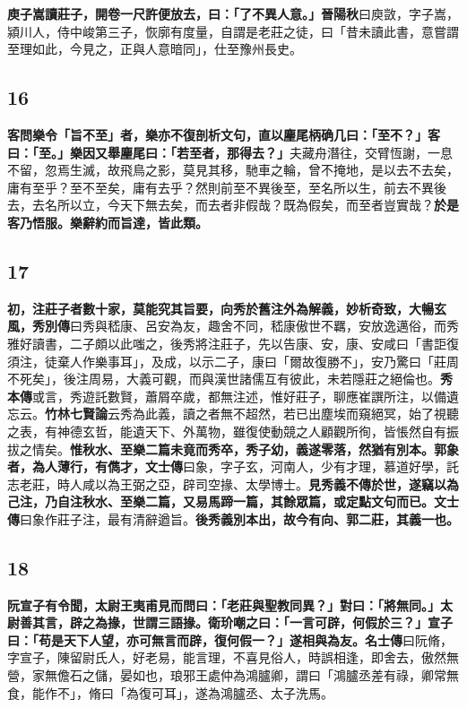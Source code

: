 \textbf{庾子嵩讀莊子，開卷一尺許便放去，曰：「了不異人意。」}{\footnotesize \textbf{晉陽秋}曰庾敳，字子嵩，潁川人，侍中峻第三子，恢廓有度量，自謂是老莊之徒，曰「昔未讀此書，意嘗謂至理如此，今見之，正與人意暗同」，仕至豫州長史。}

\subsection*{16}

\textbf{客問樂令「旨不至」者，樂亦不復剖析文句，直以麈尾柄确几曰：「至不？」客曰：「至。」樂因又舉麈尾曰：「若至者，那得去？」}{\footnotesize 夫藏舟潛往，交臂恆謝，一息不留，忽焉生滅，故飛鳥之影，莫見其移，馳車之輪，曾不掩地，是以去不去矣，庸有至乎？至不至矣，庸有去乎？然則前至不異後至，至名所以生，前去不異後去，去名所以立，今天下無去矣，而去者非假哉？既為假矣，而至者豈實哉？}\textbf{於是客乃悟服。樂辭約而旨達，皆此類。}

\subsection*{17}

\textbf{初，注莊子者數十家，莫能究其旨要，向秀於舊注外為解義，妙析奇致，大暢玄風，}{\footnotesize \textbf{秀別傳}曰秀與嵇康、呂安為友，趣舍不同，嵇康傲世不羈，安放逸邁俗，而秀雅好讀書，二子頗以此嗤之，後秀將注莊子，先以告康、安，康、安咸曰「書詎復須注，徒棄人作樂事耳」，及成，以示二子，康曰「爾故復勝不」，安乃驚曰「莊周不死矣」，後注周易，大義可觀，而與漢世諸儒互有彼此，未若隱莊之絕倫也。\textbf{秀本傳}或言，秀遊託數賢，蕭屑卒歲，都無注述，惟好莊子，聊應崔譔所注，以備遺忘云。\textbf{竹林七賢論}云秀為此義，讀之者無不超然，若已出塵埃而窺絕冥，始了視聽之表，有神德玄哲，能遺天下、外萬物，雖復使動競之人顧觀所徇，皆悵然自有振拔之情矣。}\textbf{惟秋水、至樂二篇未竟而秀卒，秀子幼，義遂零落，然猶有別本。郭象者，為人薄行，有儁才，}{\footnotesize \textbf{文士傳}曰象，字子玄，河南人，少有才理，慕道好學，託志老莊，時人咸以為王弼之亞，辟司空掾、太學博士。}\textbf{見秀義不傳於世，遂竊以為己注，乃自注秋水、至樂二篇，又易馬蹄一篇，其餘眾篇，或定點文句而已。}{\footnotesize \textbf{文士傳}曰象作莊子注，最有清辭遒旨。}\textbf{後秀義別本出，故今有向、郭二莊，其義一也。}

\subsection*{18}

\textbf{阮宣子有令聞，太尉王夷甫見而問曰：「老莊與聖教同異？」對曰：「將無同。」太尉善其言，辟之為掾，世謂三語掾。衛玠嘲之曰：「一言可辟，何假於三？」宣子曰：「苟是天下人望，亦可無言而辟，復何假一？」遂相與為友。}{\footnotesize \textbf{名士傳}曰阮脩，字宣子，陳留尉氏人，好老易，能言理，不喜見俗人，時誤相逢，即舍去，傲然無營，家無儋石之儲，晏如也，琅邪王處仲為鴻臚卿，謂曰「鴻臚丞差有祿，卿常無食，能作不」，脩曰「為復可耳」，遂為鴻臚丞、太子洗馬。}

